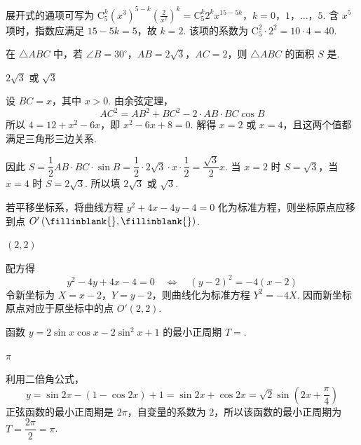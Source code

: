 \documentclass[UTF8,a4paper,oneside,11pt]{ctexbook}
\begin{document}
\begin{solution}
展开式的通项可写为
\(\mathrm C_5^k(x^3)^{5-k}\left(\frac2{x^2}\right)^k=\mathrm C_5^k2^k x^{15-5k}\)，\(k=0\)，\(1\)，\(\ldots\)，\(5\).
含 \(x^5\) 项时，指数应满足 \(15-5k=5\)，故 \(k=2\). 该项的系数为 \(\mathrm C_5^2\cdot2^2=10\cdot4=40\).
\end{solution}

\begin{problem}
在 \(\triangle ABC\) 中，若 \(\angle B=30^\circ\)，\(AB=2\sqrt{3}\)，\(AC=2\)，则 \(\triangle ABC\) 的面积 \(S\) 是\fillinblank{}.
\end{problem}

\begin{answer}
\(2\sqrt{3}\) 或 \(\sqrt{3}\)
\end{answer}

\begin{solution}
设 \(BC=x\)，其中 \(x>0\). 由余弦定理，
\[
AC^2=AB^2+BC^2-2\cdot AB\cdot BC\cos B
\]
所以 \(4=12+x^2-6x\)，即 \(x^2-6x+8=0\). 解得 \(x=2\) 或 \(x=4\)，且这两个值都满足三角形三边关系.

因此 \(S=\dfrac12AB\cdot BC\cdot\sin B=\dfrac12\cdot2\sqrt3\cdot x\cdot\dfrac12=\dfrac{\sqrt3}{2}x\). 当 \(x=2\) 时 \(S=\sqrt3\)，当 \(x=4\) 时 \(S=2\sqrt3\). 所以填 \(2\sqrt3\) 或 \(\sqrt3\).
\end{solution}

\begin{problem}
若平移坐标系，将曲线方程 \(y^2 + 4x - 4y - 4 = 0\) 化为标准方程，则坐标原点应移到点 \(O'\left(\fillinblank{},\fillinblank{} \right)\).
\end{problem}

\begin{answer}
\((2,2)\)
\end{answer}

\begin{solution}
配方得
\[
y^2-4y+4x-4=0\quad\Longleftrightarrow\quad (y-2)^2=-4(x-2)
\]
令新坐标为 \(X=x-2\)，\(Y=y-2\)，则曲线化为标准方程 \(Y^2=-4X\). 因而新坐标原点对应于原坐标中的点 \(O'(2,2)\).
\end{solution}

\begin{problem}
函数 \(y = 2\sin x \cos x - 2\sin^2 x + 1\) 的最小正周期 \(T=\)\fillinblank{}.
\end{problem}

\begin{answer}
\(\pi\)
\end{answer}

\begin{solution}
利用二倍角公式，
\[
y=\sin2x-\left(1-\cos2x\right)+1=\sin2x+\cos2x=\sqrt2\sin\left(2x+\frac\pi4\right)
\]
正弦函数的最小正周期是 \(2\pi\)，自变量的系数为 \(2\)，所以该函数的最小正周期为 \(T=\dfrac{2\pi}{2}=\pi\).
\end{solution}
\end{document}
